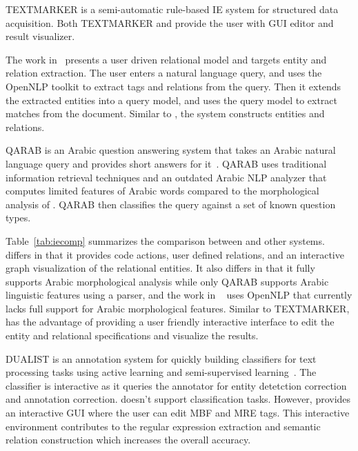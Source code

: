 TEXTMARKER is a semi-automatic rule-based IE system 
for structured data acquisition\cite{atzmueller2008rule}.
Both TEXTMARKER and \framework provide the user with GUI editor and result visualizer. 

The work in~\cite{urbain2012user} presents a user 
driven relational model and targets entity and relation extraction. 
The user enters a natural language query, and uses the OpenNLP toolkit to 
extract tags and relations from the query. 
Then it extends the extracted entities into a query model,
and uses the query model to extract matches from the document. 
Similar to \framework, the system constructs entities and relations. 

QARAB is an Arabic question answering system that 
takes an Arabic natural language query and provides short answers for it~\cite{hammo2002qarab}. 
QARAB uses traditional information retrieval techniques and an outdated Arabic NLP 
analyzer that computes limited features of Arabic words compared 
to the morphological analysis of \framework. 
QARAB then classifies the query against a set of known question types. 

Table~\ref{tab:iecomp} summarizes the comparison between \framework and
other systems. \framework differs in that it provides 
code actions, user defined relations, and an interactive 
graph visualization of the relational entities. 
It also differs in that it fully supports Arabic morphological analysis
while only QARAB supports Arabic linguistic features using a parser, and 
the work in ~\cite{urbain2012user} uses OpenNLP that currently lacks full
support for Arabic morphological features. 
Similar to TEXTMARKER, \framework has the advantage of providing 
a user friendly interactive interface to edit the entity and relational 
specifications and visualize the results. 

DUALIST is an annotation system for quickly building classifiers for 
text processing tasks using active learning and semi-supervised learning~\cite{settles2011closing}. 
The classifier is interactive as it queries the annotator 
for entity detetction correction and annotation correction. 
\framework doesn't support classification tasks. 
However, \framework provides an interactive GUI where the user can edit MBF and MRE tags. 
This interactive environment contributes to the regular expression 
extraction and semantic relation construction which increases the overall accuracy.

